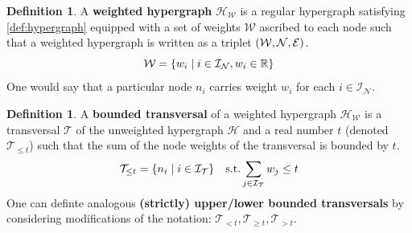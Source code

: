 \documentclass[aps, 10pt, english, twoside, pra, nofootinbib, longbibliography]{revtex4-1}
\theoremstyle{plain}
\theoremstyle{definition}
\newtheorem{definition}[theorem]{Definition}
\theoremstyle{remark}
\newcommand{\hgraph}{\mathcal{H}}
\newcommand{\nodes}{\mathcal{N}}
\newcommand{\weights}{\mathcal{W}}
\newcommand{\edges}{\mathcal{E}}
\newcommand{\trans}{\mathcal{T}}
\newcommand{\ind}{\mathcal{I}}
\newcommand{\mset}[1]{\gamma^{#1}}
\newcommand{\term}[1]{\textcolor{Mahogany}{\textbf{#1}}}
\begin{document}
    \begin{definition}
        A \term{weighted hypergraph} $\hgraph_\weights$ is a regular hypergraph satisfying \cref{def:hypergraph} equipped with a set of weights $\weights$ ascribed to each node such that a weighted hypergraph is written as a triplet $\br{\weights, \nodes, \edges}$.
        \[ \weights = \bc{w_i \mid i \in \ind_\nodes, w_i \in \R} \]
        One would say that a particular node $n_i$ carries weight $w_i$ for each $i \in \ind_\nodes$.
    \end{definition}

    \begin{definition}
        A \term{bounded transversal} of a weighted hypergraph $\hgraph_\weights$ is a transversal $\trans$ of the unweighted hypergraph $\hgraph$ and a real number $t$ (denoted $\trans_{\leq t}$) such that the sum of the node weights of the transversal is bounded by $t$.
        \[ \trans_{\leq t} = \bc{n_i \mid i \in \ind_\trans} \quad \text{s.t.} \sum_{j\in\ind_\trans} w_j \leq t \]
        One can definte analogous \term{(strictly) upper/lower bounded transversals} by considering modifications of the notation: $\trans_{< t}, \trans_{\geq t}, \trans_{> t}$.
    \end{definition}




\end{document}
